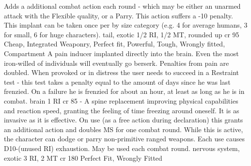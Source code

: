 \documentclass[12pt,a4paper,openany,usenames,dvipsnames]{book}
\begin{document}
    	{Adds a additional combat action each round
    		- which may be either an unarmed attack with the Flexible quality,
    		or a Parry.
    		This action suffers a -10 penalty.
    		\\%
    	This implant can be taken once per by size category (e.g. 4 for average humans, 3 for small, 6 for huge characters).}
    	{tail, exotic}
    	{1/2 RI, 1/2 MT, rounded up}
    	{cr 95}
    	{Cheap, Integrated Weaponry, Perfect fit, Powerful, Tough, Wrongly fitted, Compartment}
    	{A pain inducer implanted directly into the brain.
    		Even the most iron-willed of individuals will eventually go berserk.}
    	{Penalties from pain are doubled.
    		When provoked or in distress the user needs to succeed in a Restraint test 
    		- this test takes a penalty equal to the amount of days since he was last frenzied.
    		On a failure he is frenzied for about an hour, at least as long as he is in combat.}
    	{brain}
    	{1 RI}
    	{cr 85}
    	{-}
    	{A spine replacement improving physical capabilities and reaction speed,
    		granting the feeling of time freezing around oneself.
    		It is as invasive as it is effective.}
    	{On use (as a free action during declaration) this grants an additional action and doubles MS for one combat round.
    		While this is active, the character can dodge or parry non-primitive ranged weapons.
    		Each use causes D10-(unused RI) exhaustion.
    		May be used each combat round.}
    	{nervous system, exotic}
    	{3 RI, 2 MT}
    	{cr 180}
    	{Perfect Fit, Wrongly Fitted}
\end{document}
